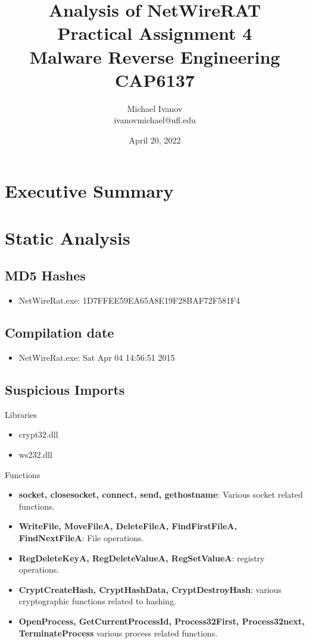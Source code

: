 \documentclass{article}
\title{Analysis of NetWireRAT\\Practical Assignment 4\\Malware Reverse Engineering \\
CAP6137}
\author{Michael Ivanov \\
ivanovmichael@ufl.edu}
\date{April 20, 2022}
\begin{document}
    \maketitle
    \pagebreak
    \section{Executive Summary}
    \pagebreak
    \section{Static Analysis}
    \subsection{MD5 Hashes}
    \begin{itemize}
        \item NetWireRat.exe: 1D7FFEE59EA65A8E19F28BAF72F581F4
    \end{itemize}
    \subsection{Compilation date}
    \begin{itemize}
        \item NetWireRat.exe: Sat Apr 04 14:56:51 2015
    \end{itemize}
    \subsection{Suspicious Imports}
    Libraries
    \begin{itemize}
        \item crypt32.dll
        \item ws2\textunderscore32.dll
    \end{itemize}
    Functions
    \begin{itemize}
        \item \textbf{socket, closesocket, connect, send, gethostname}: Various socket related functions.
        \item \textbf{WriteFile, MoveFileA, DeleteFileA, FindFirstFileA, FindNextFileA}: File operations.
        \item \textbf{RegDeleteKeyA, RegDeleteValueA, RegSetValueA}: registry operations.
        \item \textbf{CryptCreateHash, CryptHashData, CryptDestroyHash}: various cryptographic functions related to hashing.
        \item \textbf{OpenProcess, GetCurrentProcessId, Process32First, Process32next, TerminateProcess} various process related functions.
    \end{itemize}
\end{document}
